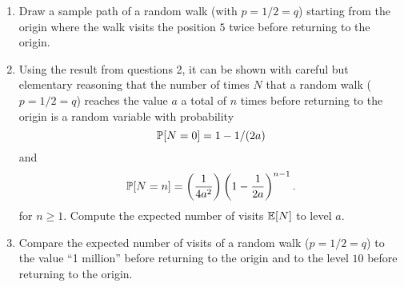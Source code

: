 \begin{problem}
  \begin{enumerate}
    \item Draw a sample path of a random walk (with $p = 1/2 = q$) 
      starting from the
      origin where the walk visits the position $5$ twice before
      returning to the origin.
    \item Using the result from questions 2, it can be shown
      with careful but elementary reasoning that the number of times
      $N$ that a random
      walk ($p = 1/2 = q$) reaches the value $a$ a total of
      $n$ times before
      returning to the origin is a random variable with
      probability
      \[
           \P[N=0] = 1 - 1/(2a)
      \]
      and
      \[
          \P[N=n] = \left( \frac{1}{4a^2} \right) \left( 1 -
          \frac{1}{2a} \right)^{n-1}.
      \]  
      for $n \ge 1$.
      Compute the
      expected number of visits $\E[N]$ to level $a$.
    \item Compare the expected number of visits of a random walk
      ($p= 1/2 = q$) to the value ``1 million'' before returning to
      the origin and to the level $10$ before returning to the origin.
  \end{enumerate}
\end{problem} 
